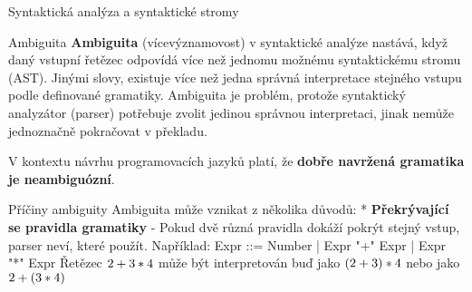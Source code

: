 \chap Syntaktická analýza a syntaktické stromy

\sec Ambiguita
{\bf Ambiguita} (vícevýznamovost) v syntaktické analýze nastává, když daný vstupní řetězec odpovídá více než jednomu možnému syntaktickému stromu (AST).
Jinými slovy, existuje více než jedna správná interpretace stejného vstupu podle definované gramatiky. Ambiguita je problém, protože syntaktický analyzátor (parser) potřebuje zvolit jedinou správnou interpretaci, jinak nemůže jednoznačně pokračovat v překladu.

V kontextu návrhu programovacích jazyků platí, že {\bf dobře navržená gramatika je neambiguózní}.

\secc Příčiny ambiguity
Ambiguita může vznikat z několika důvodů:
\begitems 
* {\bf Překrývající se pravidla gramatiky} - Pokud dvě různá pravidla dokáží pokrýt stejný vstup, parser neví, které použít. Například: 
\begtt
Expr ::= Number | Expr "+" Expr | Expr "*" Expr
\endtt
Řetězec $ 2 + 3 \char42 4$ může být interpretován buď jako $ (2 + 3) \char42 4$ nebo jako $ 2 + (3 \char42 4)$

